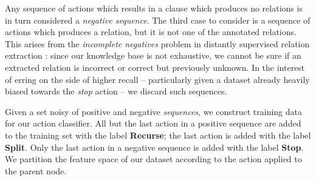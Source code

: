 Any sequence of actions which results in a clause which produces no relations
  is in turn considered a \textit{negative sequence}.
%
The third case to consider is a sequence of actions which produces a relation,
  but it is not one of the annotated relations.
This arises from the \textit{incomplete negatives} problem in distantly
  supervised relation extraction \cite{key:2013min-incomplete}: 
  since our knowledge base is not exhaustive,
  we cannot be sure if an extracted relation is incorrect or correct but
  previously unknown.
In the interest of erring on the side of higher recall -- particularly given
  a dataset already heavily biased towards the \textit{stop} action --
  we discard such sequences.


Given a set noisy of positive and negative \textit{sequences}, we construct 
  training data for our action classifier.
All but the last action in a positive sequence are added to the training set
  with the label \textbf{Recurse}; the last action is added with the label
  \textbf{Split}.
Only the last action in a negative sequence is added with the label \textbf{Stop}.
We partition the feature space of our dataset according to the action
  applied to the parent node.

%
%

